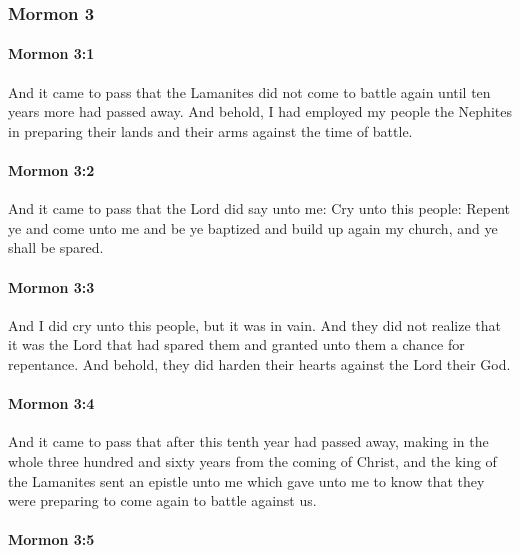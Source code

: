 	\subsubsection{Mormon 3} %
		\label{MORMON-3}
		
		\paragraph{Mormon 3:1} %
			\label{MORMON-3-1}

			And it came to pass that the Lamanites did not come to battle again
			until ten years more had passed away.
			And behold, I had employed my people the Nephites
			in preparing their lands and their arms against the time of battle.

		\paragraph{Mormon 3:2} %
			\label{MORMON-3-2}

			And it came to pass that the Lord did say unto me:
			Cry unto this people:
			Repent ye and come unto me
			and be ye baptized and build up again my church,
			and ye shall be spared.

		\paragraph{Mormon 3:3} %
			\label{MORMON-3-3}

			And I did cry unto this people,
			but it was in vain.
			And they did not realize that it was the Lord
			that had spared them and granted unto them a chance for repentance.
			And behold, they did harden their hearts against the Lord their God.

		\paragraph{Mormon 3:4} %
			\label{MORMON-3-4}

			And it came to pass that after this tenth year had passed away,
			making in the whole three hundred and sixty years from the coming of Christ,
			and the king of the Lamanites sent an epistle unto me
			which gave unto me to know
			that they were preparing to come again to battle against us.

		\paragraph{Mormon 3:5} %
			\label{MORMON-3-5}

